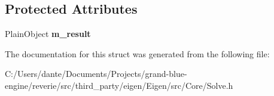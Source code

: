 \subsection*{Protected Attributes}
\begin{DoxyCompactItemize}
\item 
\mbox{\label{struct_eigen_1_1internal_1_1evaluator_3_01_solve_3_01_decomposition_00_01_rhs_type_01_4_01_4_a9bd444f627cfbe62630354701ad2a387}} 
Plain\+Object {\bfseries m\+\_\+result}
\end{DoxyCompactItemize}


The documentation for this struct was generated from the following file\+:\begin{DoxyCompactItemize}
\item 
C\+:/\+Users/dante/\+Documents/\+Projects/grand-\/blue-\/engine/reverie/src/third\+\_\+party/eigen/\+Eigen/src/\+Core/Solve.\+h\end{DoxyCompactItemize}
